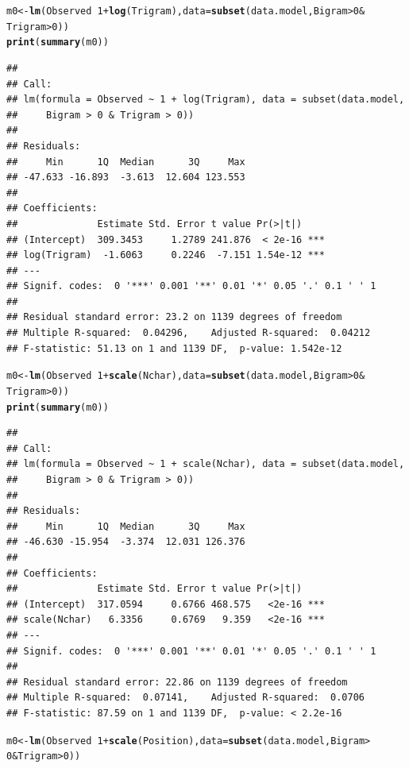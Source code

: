 \documentclass{article}\usepackage[]{graphicx}\usepackage[]{color}
\makeatletter
\newcommand{\hlnum}[1]{\textcolor[rgb]{0.686,0.059,0.569}{#1}}%
\newcommand{\hlopt}[1]{\textcolor[rgb]{0,0,0}{#1}}%
\newcommand{\hlstd}[1]{\textcolor[rgb]{0.345,0.345,0.345}{#1}}%
\newcommand{\hlkwb}[1]{\textcolor[rgb]{0.69,0.353,0.396}{#1}}%
\newcommand{\hlkwc}[1]{\textcolor[rgb]{0.333,0.667,0.333}{#1}}%
\newcommand{\hlkwd}[1]{\textcolor[rgb]{0.737,0.353,0.396}{\textbf{#1}}}%
\newenvironment{kframe}{%
 \def\at@end@of@kframe{}%
 \ifinner\ifhmode%
  \def\at@end@of@kframe{\end{minipage}}%
  \begin{minipage}{\columnwidth}%
 \fi\fi%
 \def\FrameCommand##1{\hskip\@totalleftmargin \hskip-\fboxsep
 \colorbox{shadecolor}{##1}\hskip-\fboxsep
     \hskip-\linewidth \hskip-\@totalleftmargin \hskip\columnwidth}%
 \MakeFramed {\advance\hsize-\width
   \@totalleftmargin\z@ \linewidth\hsize
   \@setminipage}}%
 {\par\unskip\endMakeFramed%
 \at@end@of@kframe}
\newenvironment{knitrout}{}{} %
\makeatother
\begin{document}
\begin{knitrout}
\begin{kframe}
\begin{alltt}
\hlstd{m0} \hlkwb{<-} \hlkwd{lm}\hlstd{(Observed} \hlopt{~} \hlnum{1} \hlopt{+} \hlkwd{log}\hlstd{(Trigram),} \hlkwc{data} \hlstd{=} \hlkwd{subset}\hlstd{(data.model, Bigram} \hlopt{>} \hlnum{0} \hlopt{&}
    \hlstd{Trigram} \hlopt{>} \hlnum{0}\hlstd{))}
\hlkwd{print}\hlstd{(}\hlkwd{summary}\hlstd{(m0))}
\end{alltt}
\begin{verbatim}
## 
## Call:
## lm(formula = Observed ~ 1 + log(Trigram), data = subset(data.model, 
##     Bigram > 0 & Trigram > 0))
## 
## Residuals:
##     Min      1Q  Median      3Q     Max 
## -47.633 -16.893  -3.613  12.604 123.553 
## 
## Coefficients:
##              Estimate Std. Error t value Pr(>|t|)    
## (Intercept)  309.3453     1.2789 241.876  < 2e-16 ***
## log(Trigram)  -1.6063     0.2246  -7.151 1.54e-12 ***
## ---
## Signif. codes:  0 '***' 0.001 '**' 0.01 '*' 0.05 '.' 0.1 ' ' 1
## 
## Residual standard error: 23.2 on 1139 degrees of freedom
## Multiple R-squared:  0.04296,	Adjusted R-squared:  0.04212 
## F-statistic: 51.13 on 1 and 1139 DF,  p-value: 1.542e-12
\end{verbatim}
\begin{alltt}
\hlstd{m0} \hlkwb{<-} \hlkwd{lm}\hlstd{(Observed} \hlopt{~} \hlnum{1} \hlopt{+} \hlkwd{scale}\hlstd{(Nchar),} \hlkwc{data} \hlstd{=} \hlkwd{subset}\hlstd{(data.model, Bigram} \hlopt{>} \hlnum{0} \hlopt{&}
    \hlstd{Trigram} \hlopt{>} \hlnum{0}\hlstd{))}
\hlkwd{print}\hlstd{(}\hlkwd{summary}\hlstd{(m0))}
\end{alltt}
\begin{verbatim}
## 
## Call:
## lm(formula = Observed ~ 1 + scale(Nchar), data = subset(data.model, 
##     Bigram > 0 & Trigram > 0))
## 
## Residuals:
##     Min      1Q  Median      3Q     Max 
## -46.630 -15.954  -3.374  12.031 126.376 
## 
## Coefficients:
##              Estimate Std. Error t value Pr(>|t|)    
## (Intercept)  317.0594     0.6766 468.575   <2e-16 ***
## scale(Nchar)   6.3356     0.6769   9.359   <2e-16 ***
## ---
## Signif. codes:  0 '***' 0.001 '**' 0.01 '*' 0.05 '.' 0.1 ' ' 1
## 
## Residual standard error: 22.86 on 1139 degrees of freedom
## Multiple R-squared:  0.07141,	Adjusted R-squared:  0.0706 
## F-statistic: 87.59 on 1 and 1139 DF,  p-value: < 2.2e-16
\end{verbatim}
\begin{alltt}
\hlstd{m0} \hlkwb{<-} \hlkwd{lm}\hlstd{(Observed} \hlopt{~} \hlnum{1} \hlopt{+} \hlkwd{scale}\hlstd{(Position),} \hlkwc{data} \hlstd{=} \hlkwd{subset}\hlstd{(data.model, Bigram} \hlopt{>}
    \hlnum{0} \hlopt{&} \hlstd{Trigram} \hlopt{>} \hlnum{0}\hlstd{))}

\end{alltt}
\end{kframe}
\end{knitrout}
\end{document}
